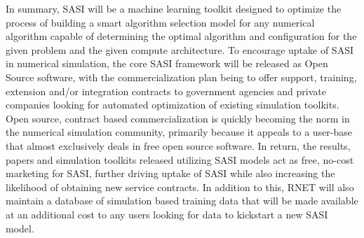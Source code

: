 In summary, SASI will be a machine learning toolkit designed to optimize the process of building a smart algorithm selection model for any numerical algorithm capable of determining the optimal algorithm and configuration for the given problem and the given compute architecture. To encourage uptake of SASI in numerical simulation, the core SASI framework will be released as Open Source software, with the commercialization plan being to offer support, training, extension and/or integration contracts to government agencies and private companies looking for automated optimization of existing simulation toolkits.  Open source, contract based commercialization is quickly becoming the norm in the numerical simulation community, primarily because it appeals to a user-base that almost exclusively deals in free open source software. In return, the results, papers and simulation toolkits released utilizing SASI models act as free, no-cost marketing for SASI, further driving uptake of SASI while also increasing the likelihood of obtaining new service contracts. In addition to this, RNET will also maintain a database of simulation based training data that will be made available at an additional cost to any users looking for data to kickstart a new SASI model. 
